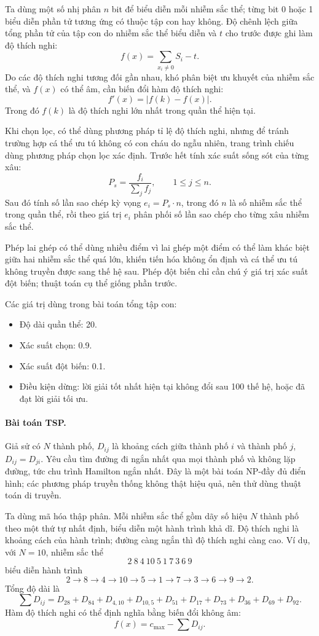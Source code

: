 \documentclass[11pt]{article}
\begin{document}
Ta dùng một số nhị phân \(n\) bit để biểu diễn mỗi nhiễm sắc thể; từng bit 0
hoặc 1 biểu diễn phần tử tương ứng có thuộc tập con hay không. Độ chênh lệch
giữa tổng phần tử của tập con do nhiễm sắc thể biểu diễn và \(t\) cho trước
được ghi làm độ thích nghi:
\[
  f(x)=\sum_{x_i\ne 0} S_i-t.
\]
Do các độ thích nghi tương đối gần nhau, khó phân biệt ưu khuyết của nhiễm
sắc thể, và \(f(x)\) có thể âm, cần biến đổi hàm độ thích nghi:
\[
  f'(x)=|f(k)-f(x)|.
\]
Trong đó \(f(k)\) là độ thích nghi lớn nhất trong quần thể hiện tại.

Khi chọn lọc, có thể dùng phương pháp tỉ lệ độ thích nghi, nhưng để tránh
trường hợp cá thể ưu tú không có con cháu do ngẫu nhiên, trang trình chiếu
dùng phương pháp chọn lọc xác định. Trước hết tính xác suất sống sót của từng
xâu:
\[
  P_s=\frac{f_i}{\sum_j f_j},\qquad 1\le j\le n.
\]
Sau đó tính số lần sao chép kỳ vọng \(e_i=P_s\cdot n\), trong đó \(n\) là số
nhiễm sắc thể trong quần thể, rồi theo giá trị \(e_i\) phân phối số lần sao
chép cho từng xâu nhiễm sắc thể.

Phép lai ghép có thể dùng nhiều điểm vì lai ghép một điểm có thể làm khác
biệt giữa hai nhiễm sắc thể quá lớn, khiến tiến hóa không ổn định và cá thể
ưu tú không truyền được sang thế hệ sau. Phép đột biến chỉ cần chú ý giá trị
xác suất đột biến; thuật toán cụ thể giống phần trước.

Các giá trị dùng trong bài toán tổng tập con:
\begin{itemize}
  \item Độ dài quần thể: 20.
  \item Xác suất chọn: 0.9.
  \item Xác suất đột biến: 0.1.
  \item Điều kiện dừng: lời giải tốt nhất hiện tại không đổi sau 100 thế hệ,
  hoặc đã đạt lời giải tối ưu.
\end{itemize}

\paragraph{Bài toán TSP.}
Giả sử có \(N\) thành phố, \(D_{ij}\) là khoảng cách giữa thành phố \(i\) và
thành phố \(j\), \(D_{ij}=D_{ji}\). Yêu cầu tìm đường đi ngắn nhất qua mọi
thành phố và không lặp đường, tức chu trình Hamilton ngắn nhất. Đây là một
bài toán NP-đầy đủ điển hình; các phương pháp truyền thống không thật hiệu
quả, nên thử dùng thuật toán di truyền.

Ta dùng mã hóa thập phân. Mỗi nhiễm sắc thể gồm dãy số hiệu \(N\) thành phố
theo một thứ tự nhất định, biểu diễn một hành trình khả dĩ. Độ thích nghi là
khoảng cách của hành trình; đường càng ngắn thì độ thích nghi càng cao. Ví
dụ, với \(N=10\), nhiễm sắc thể
\[
  2\ 8\ 4\ 10\ 5\ 1\ 7\ 3\ 6\ 9
\]
biểu diễn hành trình
\[
  2\to 8\to 4\to 10\to 5\to 1\to 7\to 3\to 6\to 9\to 2.
\]
Tổng độ dài là
\[
  \sum D_{ij}=D_{28}+D_{84}+D_{4,10}+D_{10,5}+D_{51}
  +D_{17}+D_{73}+D_{36}+D_{69}+D_{92}.
\]
Hàm độ thích nghi có thể định nghĩa bằng biến đổi không âm:
\[
  f(x)=c_{\max}-\sum D_{ij}.
\]
\end{document}
